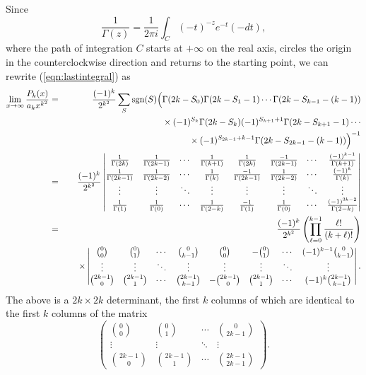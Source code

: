 \documentclass[12pt,letterpaper]{amsart}
\theoremstyle{plain}
\theoremstyle{definition}
\theoremstyle{remark}
\numberwithin{equation}{subsection}
\numberwithin{theorem}{subsection}
\numberwithin{table}{subsection}
\def\sgn{\hbox{sgn}}
\begin{document}
Since
\begin{equation}
 \frac{1}{\Gamma(z)}=\frac{1}{2\pi i} \int_C
(-t)^{-z} e^{-t} (-dt),
\end{equation}
where the path of integration $C$ starts at $+\infty$ on the real
axis, circles the origin in the counterclockwise direction and
returns to the starting point, we can rewrite
(\ref{eqn:lastintegral}) as
\begin{eqnarray}
\lim_{x\rightarrow \infty}\frac{P_k(x)}{a_k x^{k^2}}
&=&\frac{(-1)^{k}}{2^{k^2}} \sum_S \sgn(S) \Big(\Gamma(2k-S_0) \Gamma(2k-S_1-1)
\cdots \Gamma(2k-S_{k-1}-(k-1)) \nonumber \\
& &\phantom{xxxxxxxxxxxxx}  \times(-1)^{S_k}
\Gamma(2k-S_k) (-1)^{S_{k+1}+1} \Gamma(2k-S_{k+1}-1) \cdots\nonumber \\
& &\phantom{xxxxxxxxxxxxx}  \times (-1)^{S_{2k-1}+k-1}
\Gamma(2k-S_{2k-1}-(k-1))\Big)^{-1} \nonumber \\
&=&\frac{(-1)^{k}}{2^{k^2}}\vmatrix \frac{1}{\Gamma(2k)} &
\frac{1}{\Gamma(2k-1)} & \cdots & \frac{1}{\Gamma(k+1)} &
\frac{1}{\Gamma(2k)}& \frac{-1}{\Gamma(2k-1)}& \cdots &
\frac{(-1)^{k-1}}{\Gamma(k+1)}
\\ \frac{1}{\Gamma(2k-1)} & \frac{1}{\Gamma(2k-2)} &\cdots &
\frac{1}{\Gamma(k)} & \frac{-1}{\Gamma(2k-1)} &
\frac{1}{\Gamma(2k-2)} & \cdots & \frac{(-1)^{k}}{\Gamma(k)} \\
\vdots& \vdots&\ddots&\vdots&\vdots &\vdots&\ddots&\vdots\\
\frac{1}{\Gamma(1)} & \frac{1}{\Gamma(0)} & \cdots &
\frac{1}{\Gamma(2-k)} & \frac{-1}{\Gamma(1)} & \frac{1}{\Gamma(0)}
& \cdots & \frac{(-1)^{3k-2}}{\Gamma(2-k)}
\endvmatrix\nonumber \\
&=&\frac{(-1)^{k}}{2^{k^2}}\left(\prod_{\ell=0}^{k-1} \frac{\ell!}{(k+\ell)!}
\right)\nonumber \\
 &&\ \ \ \ \times \vmatrix\binom{0}{0} & \binom{0}{1} &
\cdots & \binom{0}{k-1} & \binom{0}{0} & -\binom{0}{1} & \cdots &
(-1)^{k-1}\binom {0}{k-1}
\\ \vdots & \vdots & \ddots & \vdots & \vdots & \vdots & \ddots &
\vdots \\ \binom{2k-1}{0} & \binom{2k-1}{1} & \cdots &
\binom{2k-1}{k-1} & -\binom{2k-1}{0} & \binom{2k-1}{1} & \cdots &
(-1)^k \binom{2k-1}{k-1}
\endvmatrix.
 \label{eqn:firstdeterminant} \end{eqnarray}
The above is a $2k\times 2k$ determinant, the first $k$ columns of
which are identical to the first $k$ columns of the matrix
\begin{equation}
\label{eqn:magicmatrix1} \left(\begin{array}{cccccccccccc}
\binom{0}{0} & \binom{0}{1} & \cdots & \binom{0}{2k-1} \\ \vdots &
\vdots & \ddots & \vdots
\\ \binom{2k-1}{0} & \binom{2k-1}{1} & \cdots &
\binom{2k-1}{2k-1} \end{array}\right).
\end{equation}
\end{document}
